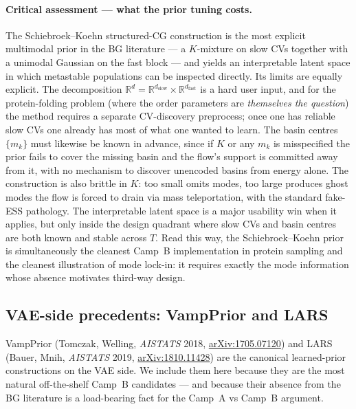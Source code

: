 \documentclass[11pt,letterpaper]{article}
\newcommand{\Real}{\mathbb{R}}
\theoremstyle{plain}
\begin{document}
\paragraph{Critical assessment --- what the prior tuning costs.} The
Schiebroek--Koehn structured-CG construction is the most explicit multimodal
prior in the BG literature --- a $K$-mixture on slow CVs together with a
unimodal Gaussian on the fast block --- and yields an interpretable latent
space in which metastable populations can be inspected directly. Its limits
are equally explicit. The decomposition
$\Real^d=\Real^{d_{\mathrm{slow}}}\times\Real^{d_{\mathrm{fast}}}$ is a hard
user input, and for the protein-folding problem (where the order parameters
are \emph{themselves the question}) the method requires a separate
CV-discovery preprocess; once one has reliable slow CVs one already has most
of what one wanted to learn. The basin centres $\{m_k\}$ must likewise be
known in advance, since if $K$ or any $m_k$ is misspecified the prior fails
to cover the missing basin and the flow's support is committed away from it,
with no mechanism to discover unencoded basins from energy alone. The
construction is also brittle in $K$: too small omits modes, too large
produces ghost modes the flow is forced to drain via mass teleportation, with
the standard fake-ESS pathology. The interpretable latent space is a major
usability win when it applies, but only inside the design quadrant where slow
CVs and basin centres are both known and stable across $T$. Read this way,
the Schiebroek--Koehn prior is simultaneously the cleanest Camp~B
implementation in protein sampling and the cleanest illustration of mode
lock-in: it requires exactly the mode information whose absence motivates
third-way design.

\subsection{VAE-side precedents: VampPrior and LARS}
\label{sec:vamp-lars}

VampPrior (Tomczak, Welling, \emph{AISTATS} 2018,
\href{https://arxiv.org/abs/1705.07120}{arXiv:1705.07120}) and LARS
(Bauer, Mnih, \emph{AISTATS} 2019,
\href{https://arxiv.org/abs/1810.11428}{arXiv:1810.11428}) are the
canonical learned-prior constructions on the VAE side. We include them
here because they are the most natural off-the-shelf Camp~B candidates
--- and because their absence from the BG literature is a load-bearing
fact for the Camp~A vs Camp~B argument.
\end{document}
